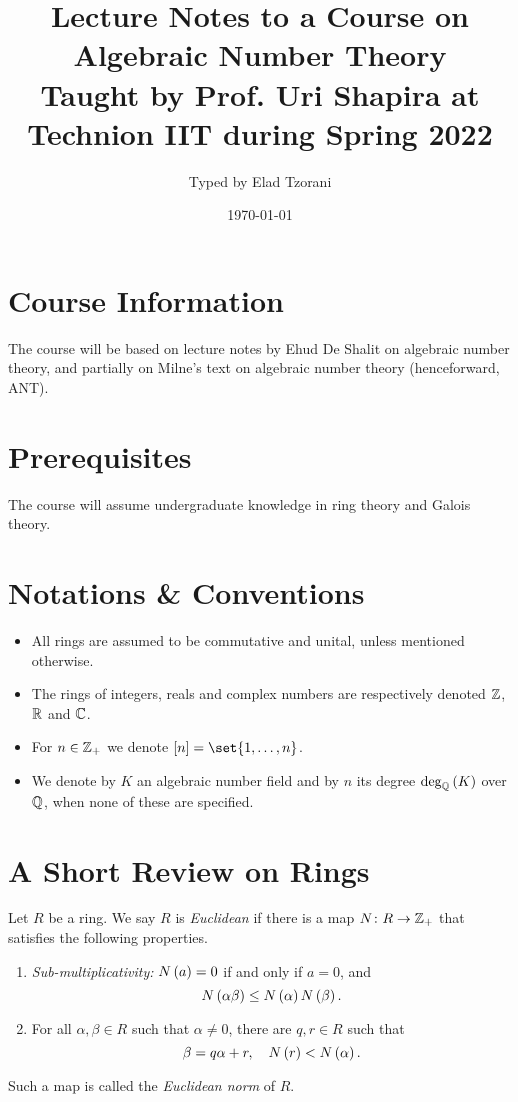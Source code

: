 \documentclass[11pt]{karticle}
\title{Lecture Notes to a Course on Algebraic Number Theory \\ \small{Taught by Prof. Uri Shapira at Technion IIT during Spring 2022}}
\author{Typed by Elad Tzorani}
\date{\today}
\begin{document}
\maketitle


\section*{Course Information}

The course will be based on lecture notes by Ehud De Shalit on algebraic number theory, and partially on Milne's text on algebraic number theory (henceforward, ANT).

\section*{Prerequisites}

The course will assume undergraduate knowledge in ring theory and Galois theory.

\section{Notations \& Conventions}


\begin{itemize}
\item All rings are assumed to be commutative and unital, unless mentioned otherwise. 
\item The rings of integers, reals and complex numbers are respectively denoted $\mathbb{Z}$, $\mathbb{R}$ and $\mathbb{C}$.
\item For $n \in \mathbb{Z}_+$ we denote $\brs{n} = \set{1, \ldots, n}$.
\item We denote by $K$ an algebraic number field and by $n$ its degree $\deg_{\mathbb{Q}}\left( K \right)$ over $\mathbb{Q}$, when none of these are specified.
\end{itemize}

\section{A Short Review on Rings}

\begin{definition}
Let $R$ be a ring. We say $R$ is \emph{Euclidean} if there is a map $N \colon R \to \mathbb{Z}_+$ that satisfies the following properties.

\begin{enumerate}[label = (\roman*)]
\item \emph{Sub-multiplicativity:} $N\left( a \right) = 0$ if and only if $a=0$, and
\[N\left( \alpha \beta \right) \leq N\left( \alpha \right) N\left( \beta \right) \text{.}\]
\item For all $\alpha,\beta \in R$ such that $\alpha \neq 0$, there are $q,r \in R$ such that
\[\beta = q \alpha + r, \quad N\left( r \right) < N\left( \alpha \right) \text{.}\]
\end{enumerate}

Such a map is called the \emph{Euclidean norm} of $R$.
\end{definition}
\end{document}
